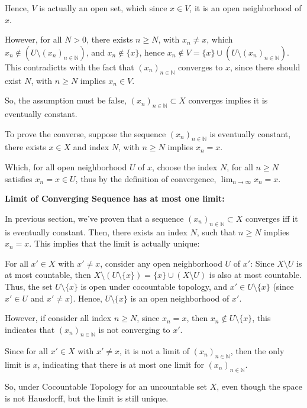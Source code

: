 \documentclass{article}
\begin{document}
Hence, $V$ is actually an open set, which since $x\in V$, it is an open neighborhood of $x$.

However, for all $N>0$, there exists $n\geq N$, with $x_n\neq x$, which $x_n\notin (U\setminus (x_n)_{n\in\mathbb{N}})$, and $x_n\notin \{x\}$,
hence $x_n \notin V=\{x\}\cup (U\setminus (x_n)_{n\in\mathbb{N}})$. This contradictts with the fact that $(x_n)_{n\in\mathbb{N}}$ converges to $x$,
since there should exist $N$, with $n\geq N$ implies $x_n \in V$.

So, the assumption must be false, $(x_n)_{n\in\mathbb{N}}\subset X$ converges implies it is eventually constant.

\hfill

To prove the converse, suppose the sequence $(x_n)_{n\in\mathbb{N}}$ is eventually constant, there exists $x\in X$ and index $N$, with $n\geq N$ implies $x_n=x$.

Which, for all open neighborhood $U$ of $x$, choose the index $N$, for all $n\geq N$ satisfies $x_n=x \in U$, thus by the definition of convergence,
$\lim_{n\rightarrow\infty}x_n=x$.

\hfill

\hfill

\textbf{Limit of Converging Sequence has at most one limit:}

In previous section, we've proven that a sequence $(x_n)_{n\in\mathbb{N}}\subset X$ converges iff it is eventually constant.
Then, there exists an index $N$, such that $n\geq N$ implies $x_n=x$. This implies that the limit is actually unique:

For all $x'\in X$ with $x'\neq x$, consider any open neighborhood $U$ of $x'$: Since $X\setminus U$ is at most countable, then $X\setminus(U\setminus\{x\})=\{x\}\cup (X\setminus U)$ is also at most countable.
Thus, the set $U\setminus \{x\}$ is open under cocountable topology, and $x'\in U\setminus\{x\}$ (since $x'\in U$ and $x'\neq x$).
Hence, $U\setminus\{x\}$ is an open neighborhood of $x'$.

However, if consider all index $n\geq N$, since $x_n=x$, then $x_n \notin U\setminus\{x\}$, this indicates that $(x_n)_{n\in\mathbb{N}}$ is not converging to $x'$.

Since for all $x'\in X$ with $x'\neq x$, it is not a limit of $(x_n)_{n\in\mathbb{N}}$, then the only limit is $x$,
indicating that there is at most one limit for $(x_n)_{n\in\mathbb{N}}$.


So, under Cocountable Topology for an uncountable set $X$, even though the space is not Hausdorff, but the limit is still unique.
\end{document}
